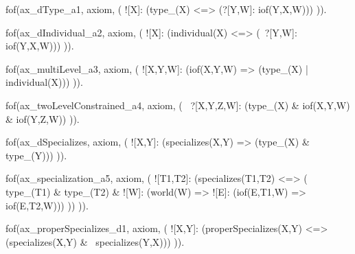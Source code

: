 fof(ax_dType_a1, axiom, (
  ![X]: (type_(X) <=> (?[Y,W]: iof(Y,X,W)))
)).

fof(ax_dIndividual_a2, axiom, (
  ![X]: (individual(X) <=> (~?[Y,W]: iof(Y,X,W)))
)).


fof(ax_multiLevel_a3, axiom, (
  ![X,Y,W]: (iof(X,Y,W) => (type_(X) | individual(X)))
)).

fof(ax_twoLevelConstrained_a4, axiom, (
  ~?[X,Y,Z,W]: (type_(X) & iof(X,Y,W) & iof(Y,Z,W))
)).







fof(ax_dSpecializes, axiom, (
  ![X,Y]: (specializes(X,Y) => (type_(X) & type_(Y)))
)).

fof(ax_specialization_a5, axiom, (
  ![T1,T2]: (specializes(T1,T2) <=> (
    type_(T1) & type_(T2) & ![W]: (world(W) => ![E]: (iof(E,T1,W) => iof(E,T2,W)))
  ))
)).

fof(ax_properSpecializes_d1, axiom, (
  ![X,Y]: (properSpecializes(X,Y) <=> (specializes(X,Y) & ~specializes(Y,X)))
)).






